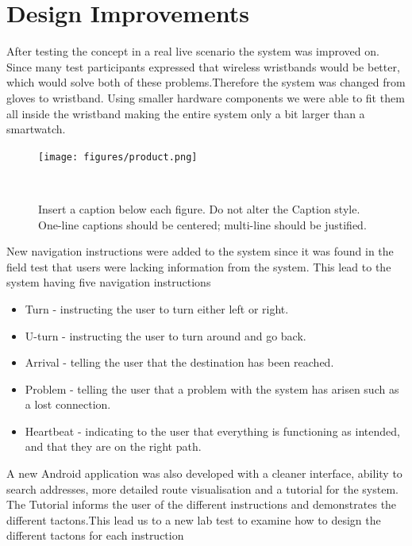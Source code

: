 \documentclass{sigchi}
\begin{document}
\section{Design Improvements}
After testing the concept in a real live scenario the system was improved on. Since many test participants expressed that wireless wristbands would be better, which would solve both of these problems.Therefore the system was changed from gloves to wristband. Using smaller hardware components we were able to fit them all inside the wristband making the entire system only a bit larger than a smartwatch.
\begin{figure}
\centering
  \texttt{[image: figures/product.png]}
  \caption{Insert a caption below each figure. Do not alter the
    Caption style.  One-line captions should be centered; multi-line
    should be justified. }~\label{fig:figure1}
\end{figure}
New navigation instructions were added to the system since it was found in the field test that users were lacking information from the system. This lead to the system having five navigation instructions
\begin{itemize}
\item Turn - instructing the user to turn either left or right.
\item U-turn - instructing the user to turn around and go back.
\item Arrival - telling the user that the destination has been reached. 
\item Problem - telling the user that a problem with the system has arisen such as a lost connection.
\item Heartbeat - indicating to the user that everything is functioning as intended, and that they are on the right path.
\end{itemize} 
A new Android application was also developed with a cleaner interface, ability to search addresses, more detailed route visualisation and a tutorial for the system. The Tutorial informs the user of the different instructions and demonstrates the different tactons.This lead us to a new lab test to examine how to design the different tactons for each instruction
\end{document}
